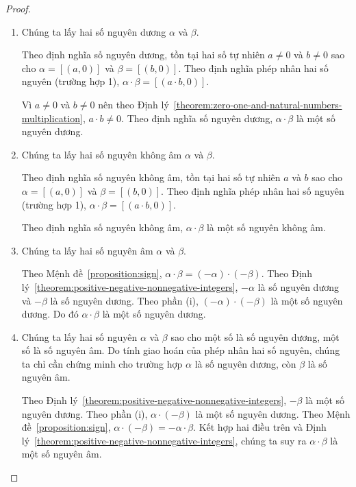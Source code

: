\begin{proof}
	\begin{enumerate}[label={(\roman*)}]
		\item Chúng ta lấy hai số nguyên dương $\alpha$ và $\beta$.

		      Theo định nghĩa số nguyên dương, tồn tại hai số tự nhiên $a\ne 0$ và $b\ne 0$ sao cho $\alpha = [(a,0)]$ và $\beta = [(b,0)]$. Theo định nghĩa phép nhân hai số nguyên (trường hợp 1), $\alpha\cdot\beta = [(a\cdot b, 0)]$.

		      Vì $a\ne 0$ và $b\ne 0$ nên theo Định lý~\ref{theorem:zero-one-and-natural-numbers-multiplication}, $a\cdot b\ne 0$. Theo định nghĩa số nguyên dương, $\alpha\cdot\beta$ là một số nguyên dương.
		\item Chúng ta lấy hai số nguyên không âm $\alpha$ và $\beta$.

		      Theo định nghĩa số nguyên không âm, tồn tại hai số tự nhiên $a$ và $b$ sao cho $\alpha = [(a,0)]$ và $\beta = [(b,0)]$. Theo định nghĩa phép nhân hai số nguyên (trường hợp 1), $\alpha\cdot\beta = [(a\cdot b, 0)]$.

		      Theo định nghĩa số nguyên không âm, $\alpha\cdot\beta$ là một số nguyên không âm.
		\item Chúng ta lấy hai số nguyên âm $\alpha$ và $\beta$.

		      Theo Mệnh đề~\ref{proposition:sign}, $\alpha\cdot\beta = (-\alpha)\cdot(-\beta)$. Theo Định lý~\ref{theorem:positive-negative-nonnegative-integers}, $-\alpha$ là số nguyên dương và $-\beta$ là số nguyên dương. Theo phần (i), $(-\alpha)\cdot(-\beta)$ là một số nguyên dương. Do đó $\alpha\cdot\beta$ là một số nguyên dương.
		\item Chúng ta lấy hai số nguyên $\alpha$ và $\beta$ sao cho một số là số nguyên dương, một số là số nguyên âm. Do tính giao hoán của phép nhân hai số nguyên, chúng ta chỉ cần chứng minh cho trường hợp $\alpha$ là số nguyên dương, còn $\beta$ là số nguyên âm.

		      Theo Định lý~\ref{theorem:positive-negative-nonnegative-integers}, $-\beta$ là một số nguyên dương. Theo phần (i), $\alpha\cdot(-\beta)$ là một số nguyên dương. Theo Mệnh đề~\ref{proposition:sign}, $\alpha\cdot(-\beta) = -\alpha\cdot\beta$. Kết hợp hai điều trên và Định lý~\ref{theorem:positive-negative-nonnegative-integers}, chúng ta suy ra $\alpha\cdot\beta$ là một số nguyên âm.
	\end{enumerate}
\end{proof}

